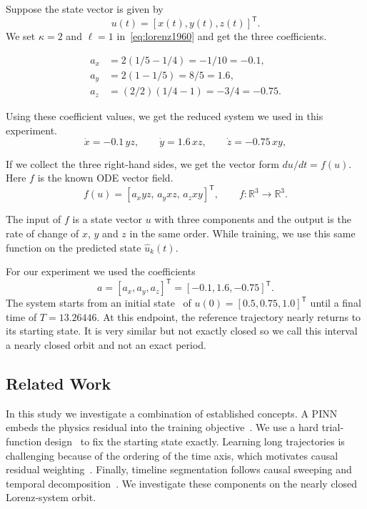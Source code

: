 \documentclass[conference,a4paper]{IEEEtran}
\begin{document}
Suppose the state vector is given by
\[
u(t)=[x(t),y(t),z(t)]^\mathsf{T}.
\]
 We set $\kappa=2$ and $\ell=1$ in~\eqref{eq:lorenz1960} and get the three coefficients.


\[
\begin{aligned}
a_x&=2(1/5-1/4)=-1/10=-0.1,\\
a_y&=2(1-1/5)=8/5=1.6,\\
a_z&=(2/2)(1/4-1)=-3/4=-0.75.
\end{aligned}
\]

Using these coefficient values, we get the reduced system we used in this experiment.
\begin{equation}
\dot{x}=-0.1\,yz,\qquad \dot{y}=1.6\,xz,\qquad \dot{z}=-0.75\,xy,
\label{eq:ode}
\end{equation}

If we collect the three right-hand sides, we get the vector form $du/dt=f(u)$. Here $f$ is the known ODE vector field.
\[
f(u)=[a_x yz,\,a_y xz,\,a_z xy]^\mathsf{T},\qquad f:\mathbb{R}^{3}\to\mathbb{R}^{3}.
\]

The input of $f$ is a state vector $u$ with three components and the output is the rate of change of $x$, $y$ and $z$ in the same order. While training, we use this same function on the predicted state $\hat{u}_k(t)$.

For our experiment we used the coefficients
\[
a=[a_x,a_y,a_z]^\mathsf{T}=[-0.1,1.6,-0.75]^\mathsf{T}.
\]
 The system starts from an initial state~\cite{matthews2024pinnde} of $u(0)=[0.5,0.75,1.0]^\mathsf{T}$ until a final time of $T=13.26446$. At this endpoint, the reference trajectory nearly returns to its starting state. It is very similar but not exactly closed so we call this interval a nearly closed orbit and not an exact period.


\subsection{Related Work}
In this study we investigate a combination of established concepts. A PINN embeds the physics residual into the training objective~\cite{raissi2019}. We use a hard trial-function design~\cite{lagaris1998} to fix the starting state exactly. Learning long trajectories is challenging because of the ordering of the time axis, which motivates causal residual weighting~\cite{wang2024causal}. Finally, timeline segmentation follows causal sweeping and temporal decomposition~\cite{penwarden2023}. We investigate these components on the nearly closed Lorenz-system orbit.
\end{document}
